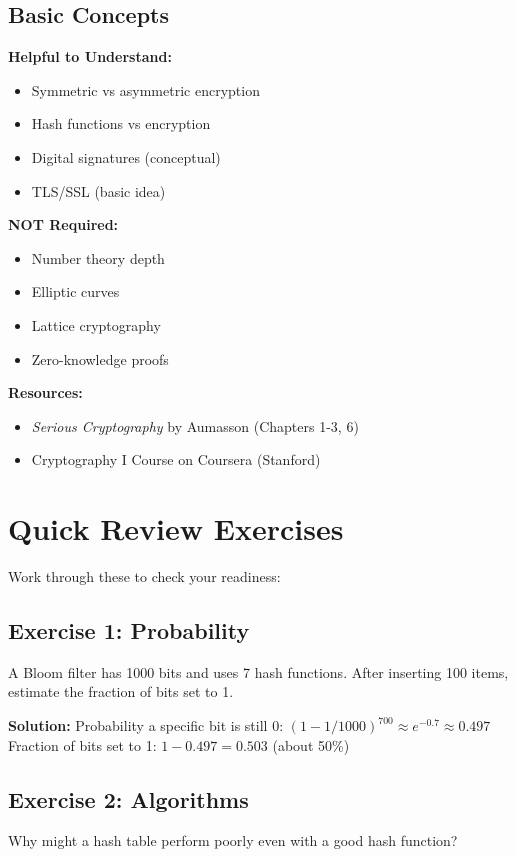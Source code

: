 \subsection{Basic Concepts}

\textbf{Helpful to Understand:}
\begin{itemize}
\item Symmetric vs asymmetric encryption
\item Hash functions vs encryption
\item Digital signatures (conceptual)
\item TLS/SSL (basic idea)
\end{itemize}

\textbf{NOT Required:}
\begin{itemize}
\item Number theory depth
\item Elliptic curves
\item Lattice cryptography
\item Zero-knowledge proofs
\end{itemize}

\textbf{Resources:}
\begin{itemize}
\item \textit{Serious Cryptography} by Aumasson (Chapters 1-3, 6)
\item Cryptography I Course on Coursera (Stanford)
\end{itemize}

\section{Quick Review Exercises}

Work through these to check your readiness:

\subsection{Exercise 1: Probability}
A Bloom filter has 1000 bits and uses 7 hash functions. After inserting 100 items, estimate the fraction of bits set to 1.

\textbf{Solution:}
Probability a specific bit is still 0: $(1 - 1/1000)^{700} \approx e^{-0.7} \approx 0.497$
Fraction of bits set to 1: $1 - 0.497 = 0.503$ (about 50\%)

\subsection{Exercise 2: Algorithms}
Why might a hash table perform poorly even with a good hash function?

